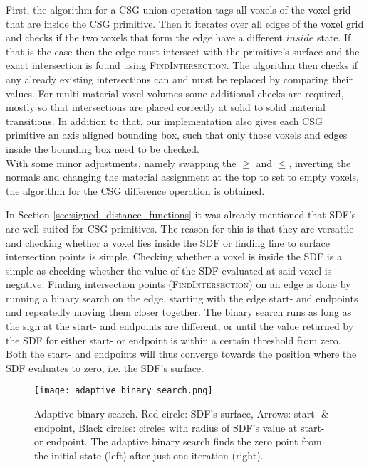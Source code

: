 First, the algorithm for a CSG union operation tags all voxels of the voxel grid that are inside the CSG primitive. Then it iterates over all edges of the voxel grid and checks if the two voxels
that form the edge have a different $inside$ state. If that is the case then the edge must intersect with the primitive's surface and the exact intersection is found
using \textsc{FindIntersection}. The algorithm then checks if any already existing intersections can and must be replaced by comparing their values. For multi-material voxel volumes some additional checks are required, mostly so that intersections are placed correctly at
solid to solid material transitions. In addition to that, our implementation also gives each CSG primitive an axis aligned bounding box, such that only those voxels and edges inside the bounding box need to be checked.\\
With some minor adjustments, namely swapping the $\geq$ and $\leq$, inverting the normals and changing the material assignment at the top to set to empty voxels, the algorithm for the CSG difference operation is obtained. \par

In Section \ref{sec:signed_distance_functions} it was already mentioned that SDF's are well suited for CSG primitives.
The reason for this is that they are versatile and checking whether a voxel lies inside the SDF or finding
line to surface intersection points is simple. Checking whether a voxel is inside the SDF is a simple as checking whether the value of the SDF evaluated at said voxel is negative.
Finding intersection points (\textsc{FindIntersection}) on an edge is done by running a binary search on the edge, starting with the edge start- and endpoints and repeatedly moving them closer together.
The binary search runs as long as the sign at the start- and endpoints are different, or until the value returned by the SDF for either start- or endpoint is within a certain threshold from zero. Both the start- and endpoints will thus converge towards the position where the SDF evaluates to zero, i.e. the SDF's surface.\\

\begin{figure}
\centering
\captionsetup{width=0.8\textwidth}
\texttt{[image: adaptive\_binary\_search.png]}
\caption{Adaptive binary search. Red circle: SDF's surface, Arrows: start- \& endpoint, Black circles: circles with radius of SDF's value at start- or endpoint. The adaptive binary search
finds the zero point from the initial state (left) after just one iteration (right).}
\label{fig:adaptive_binary_search}
\end{figure}

